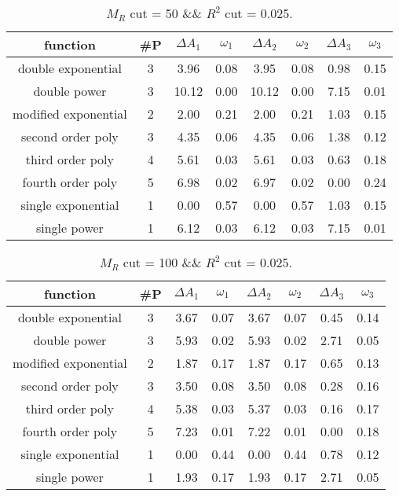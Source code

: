  
\begin{table}[H] 
\begin{center} 
\begin{tabular}{|c|c|cc|cc|cc|} 
\hline function & \#P & $\Delta A_1$ & $\omega_1$ & $\Delta A_2$ & $\omega_2$ & $\Delta A_3$ & $\omega_3$ \\ \hline 
double exponential &  3 &   3.96 &   0.08 &   3.95 &   0.08 &   0.98 &   0.15 \\ 
double power &  3 &  10.12 &   0.00 &  10.12 &   0.00 &   7.15 &   0.01 \\ 
modified exponential &  2 &   2.00 &   0.21 &   2.00 &   0.21 &   1.03 &   0.15 \\ 
second order poly &  3 &   4.35 &   0.06 &   4.35 &   0.06 &   1.38 &   0.12 \\ 
third order poly &  4 &   5.61 &   0.03 &   5.61 &   0.03 &   0.63 &   0.18 \\ 
fourth order poly &  5 &   6.98 &   0.02 &   6.97 &   0.02 &   0.00 &   0.24 \\ 
single exponential &  1 &   0.00 &   0.57 &   0.00 &   0.57 &   1.03 &   0.15 \\ 
single power &  1 &   6.12 &   0.03 &   6.12 &   0.03 &   7.15 &   0.01 \\ 
\hline 
\end{tabular} 
\caption{$M_R$ cut = 50 \&\& $R^2$ cut = 0.025.} 
\label{tab:FitChoices_50_0.025} 
\end{center} 
\end{table} 
 
 
\begin{table}[H] 
\begin{center} 
\begin{tabular}{|c|c|cc|cc|cc|} 
\hline function & \#P & $\Delta A_1$ & $\omega_1$ & $\Delta A_2$ & $\omega_2$ & $\Delta A_3$ & $\omega_3$ \\ \hline 
double exponential &  3 &   3.67 &   0.07 &   3.67 &   0.07 &   0.45 &   0.14 \\ 
double power &  3 &   5.93 &   0.02 &   5.93 &   0.02 &   2.71 &   0.05 \\ 
modified exponential &  2 &   1.87 &   0.17 &   1.87 &   0.17 &   0.65 &   0.13 \\ 
second order poly &  3 &   3.50 &   0.08 &   3.50 &   0.08 &   0.28 &   0.16 \\ 
third order poly &  4 &   5.38 &   0.03 &   5.37 &   0.03 &   0.16 &   0.17 \\ 
fourth order poly &  5 &   7.23 &   0.01 &   7.22 &   0.01 &   0.00 &   0.18 \\ 
single exponential &  1 &   0.00 &   0.44 &   0.00 &   0.44 &   0.78 &   0.12 \\ 
single power &  1 &   1.93 &   0.17 &   1.93 &   0.17 &   2.71 &   0.05 \\ 
\hline 
\end{tabular} 
\caption{$M_R$ cut = 100 \&\& $R^2$ cut = 0.025.} 
\label{tab:FitChoices_100_0.025} 
\end{center} 
\end{table} 
 

